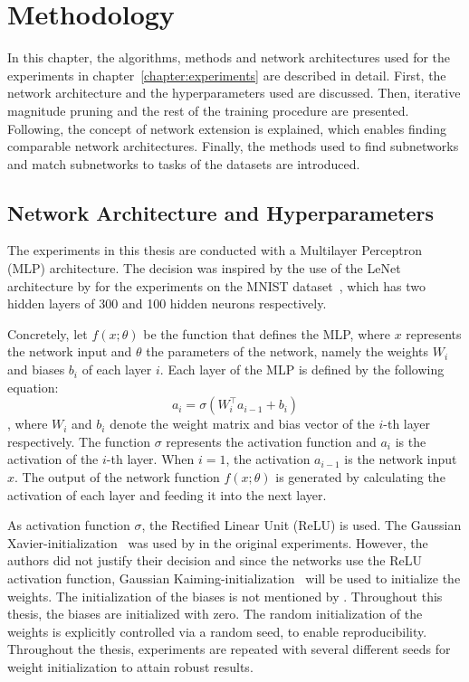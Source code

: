\chapter{Methodology}\label{chapter:method} 
In this chapter, the algorithms, methods and network architectures used for the experiments in chapter~\ref{chapter:experiments} are described in detail.
First, the network architecture and the hyperparameters used are discussed.
Then, iterative magnitude pruning and the rest of the training procedure are presented.
Following, the concept of network extension is explained, which enables finding comparable network architectures.
Finally, the methods used to find subnetworks and match subnetworks to tasks of the datasets are introduced. 

\section{Network Architecture and Hyperparameters}
The experiments in this thesis are conducted with a Multilayer Perceptron (MLP) architecture.
The decision was inspired by the use of the LeNet~\autocite{LeCun} architecture by \textcite{LTH} for the experiments on the MNIST dataset~\autocite{mnist}, which has two hidden layers of 300 and 100 hidden neurons respectively.

Concretely, let $f(x; \theta)$ be the function that defines the MLP, where $x$ represents the network input and $\theta$ the parameters of the network, namely the weights $W_i$ and biases $b_i$ of each layer $i$.
Each layer of the MLP is defined by the following equation:
\[ a_i = \sigma(W_i^\top a_{i-1} + b_{i}) \]
, where $W_i$ and $b_i$ denote the weight matrix and bias vector of the $i$-th layer respectively.
The function $\sigma$ represents the activation function and $a_i$ is the activation of the $i$-th layer.
When $i=1$, the activation $a_{i-1}$ is the network input $x$.
The output of the network function $f(x; \theta)$ is generated by calculating the activation of each layer and feeding it into the next layer.

As activation function $\sigma$, the Rectified Linear Unit (ReLU) is used.
The Gaussian Xavier-initialization~\autocite{XAVIER-GLOROT} was used by \textcite{LTH} in the original experiments.
However, the authors did not justify their decision and since the networks use the ReLU activation function, Gaussian Kaiming-initialization~\autocite{KAIMING-HE} will be used to initialize the weights.
The initialization of the biases is not mentioned by \textcite{LTH}.
Throughout this thesis, the biases are initialized with zero.
The random initialization of the weights is explicitly controlled via a random seed, to enable reproducibility.
Throughout the thesis, experiments are repeated with several different seeds for weight initialization to attain robust results.

